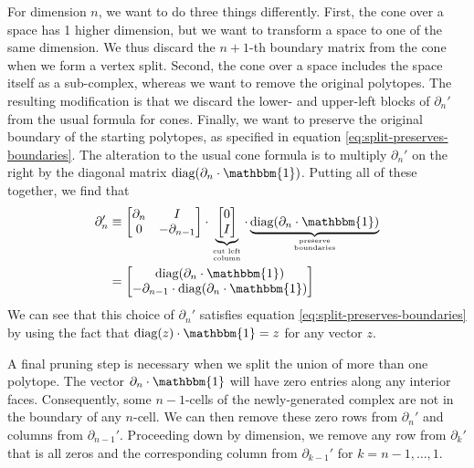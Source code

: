 \documentclass[twocolumn,leqno,twocolumn]{article}
\begin{document}
For dimension $n$, we want to do three things differently.
First, the cone over a space has 1 higher dimension, but we want to transform a space to one of the same dimension.
We thus discard the $n + 1$-th boundary matrix from the cone when we form a vertex split.
Second, the cone over a space includes the space itself as a sub-complex, whereas we want to remove the original polytopes.
The resulting modification is that we discard the lower- and upper-left blocks of $\partial_n'$ from the usual formula for cones.
Finally, we want to preserve the original boundary of the starting polytopes, as specified in equation \eqref{eq:split-preserves-boundaries}.
The alteration to the usual cone formula is to multiply $\partial_n'$ on the right by the diagonal matrix $\text{diag}(\partial_n\cdot\mathbbm{1})$.
Putting all of these together, we find that
\begin{align}
    \partial_n' & \equiv \left[\begin{matrix}\partial_n & I \\ 0 & -\partial_{n - 1}\end{matrix}\right]\cdot \underbrace{\left[\begin{matrix}0 \\ I\end{matrix}\right]}_{\text{cut left}\atop\text{column}}\cdot \underbrace{\text{diag}(\partial_n\cdot\mathbbm{1})}_{\text{preserve}\atop\text{boundaries}} \nonumber\\
        & = \left[\begin{matrix}\text{diag}(\partial_n\cdot\mathbbm{1}) \\ -\partial_{n - 1}\cdot\text{diag}(\partial_n\cdot\mathbbm{1})\end{matrix}\right]
    \label{eq:vertex-split-n}
\end{align}
We can see that this choice of $\partial_n'$ satisfies equation \eqref{eq:split-preserves-boundaries} by using the fact that $\text{diag}(z)\cdot\mathbbm{1} = z$ for any vector $z$.

A final pruning step is necessary when we split the union of more than one polytope.
The vector $\partial_n\cdot\mathbbm{1}$ will have zero entries along any interior faces.
Consequently, some $n - 1$-cells of the newly-generated complex are not in the boundary of any $n$-cell.
We can then remove these zero rows from $\partial_n'$ and columns from $\partial_{n - 1}'$.
Proceeding down by dimension, we remove any row from $\partial_k'$ that is all zeros and the corresponding column from $\partial_{k - 1}'$ for $k = n - 1, \ldots, 1$.
\end{document}
